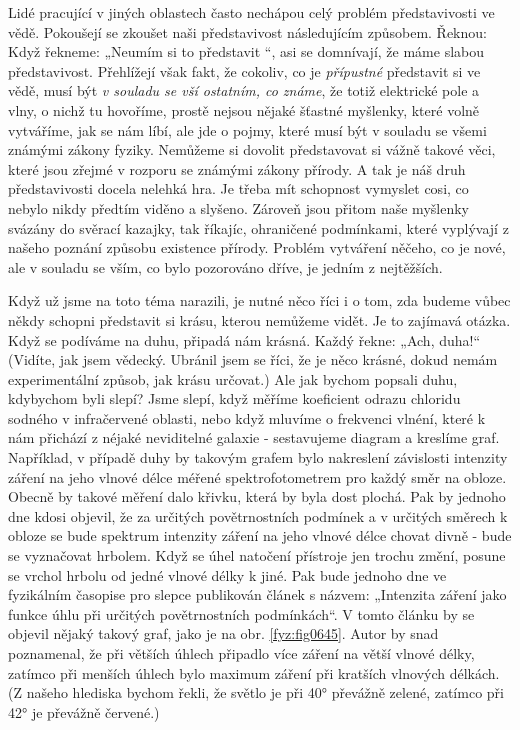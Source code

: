     Lidé pracující v jiných oblastech často nechápou celý problém představivosti ve vědě. Pokoušejí
    se zkoušet naši představivost následujícím způsobem. Řeknou:  Když řekneme: „Neumím si to představit
    “, asi se domnívají, že máme slabou představivost. Přehlížejí však fakt, že cokoliv, co je
    \emph{přípustné} představit si ve vědě, musí být \emph{v souladu se vší ostatním, co známe}, že
    totiž elektrické pole a vlny, o nichž tu hovoříme, prostě nejsou nějaké šťastné myšlenky, které
    volně vytváříme, jak se nám líbí, ale jde o pojmy, které musí být v souladu se všemi známými
    zákony fyziky. Nemůžeme si dovolit představovat si vážně takové věci, které jsou zřejmé v
    rozporu se známými zákony přírody. A tak je náš druh představivosti docela nelehká hra. Je třeba
    mít schopnost vymyslet cosi, co nebylo nikdy předtím viděno a slyšeno. Zároveň jsou přitom naše
    myšlenky svázány do svěrací kazajky, tak říkajíc, ohraničené podmínkami, které vyplývají z
    našeho poznání způsobu existence přírody. Problém vytváření něčeho, co je nové, ale v souladu se
    vším, co bylo pozorováno dříve, je jedním z nejtěžších.
    
    Když už jsme na toto téma narazili, je nutné něco říci i o tom, zda budeme vůbec někdy schopni
    představit si krásu, kterou nemůžeme vidět. Je to zajímavá otázka. Když se podíváme na duhu,
    připadá nám krásná. Každý řekne: „Ach, duha!“ (Vidíte, jak jsem vědecký. Ubránil jsem se říci,
    že je něco krásné, dokud nemám experimentální způsob, jak krásu určovat.) Ale jak bychom popsali
    duhu, kdybychom byli slepí? Jsme slepí, když měříme koeficient odrazu chloridu sodného v
    infračervené oblasti, nebo když mluvíme o frekvenci vlnéní, které k nám přichází z néjaké
    neviditelné galaxie - sestavujeme diagram a kreslíme graf. Například, v případě duhy by takovým
    grafem bylo nakreslení závislosti intenzity záření na jeho vlnové délce méřené spektrofotometrem
    pro každý směr na obloze. Obecně by takové měření dalo křivku, která by byla dost plochá. Pak by
    jednoho dne kdosi objevil, že za určitých povětrnostních podmínek a v určitých směrech k obloze
    se bude spektrum intenzity záření na jeho vlnové délce chovat divně - bude se vyznačovat
    hrbolem. Když se úhel natočení přístroje jen trochu změní, posune se vrchol hrbolu od jedné
    vlnové délky k jiné. Pak bude jednoho dne ve fyzikálním časopise pro slepce publikován článek s
    názvem: „Intenzita záření jako funkce úhlu při určitých povětrnostních podmínkách“. V tomto
    článku by se objevil nějaký takový graf, jako je na obr. \ref{fyz:fig0645}. Autor by snad
    poznamenal, že při větších úhlech připadlo více záření na větší vlnové délky, zatímco při
    menších úhlech bylo maximum záření při kratších vlnových délkách. (Z našeho hlediska bychom
    řekli, že světlo je při \ang{40} převážně zelené, zatímco při \ang{42} je převážně červené.)
    
